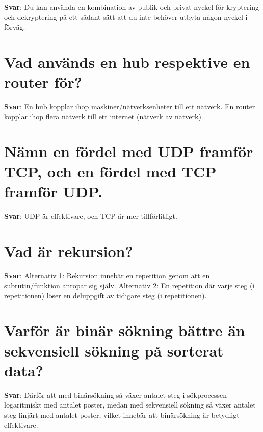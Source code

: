 \documentclass[a4paper,11pt,oneside]{book}
\begin{document}
\begin{sloppypar}
\label{q:170:sa:sv:True}

\textbf{Svar}: Du kan anv\"anda en kombination av publik och privat nyckel f\"or kryptering och dekryptering p\r{a} ett s\r{a}dant s\"att att du inte beh\"over utbyta n\r{a}gon nyckel i f\"orv\"ag.



\section{Vad anv\"ands en hub respektive en router f\"or?}

\label{q:171:sa:sv:True}

\textbf{Svar}: En hub kopplar ihop maskiner/n\"atverksenheter till ett n\"atverk. En router kopplar ihop flera n\"atverk till ett internet (n\"atverk av n\"atverk).



\section{N\"amn en f\"ordel med UDP framf\"or TCP, och en f\"ordel med TCP framf\"or UDP.}

\label{q:172:sa:sv:True}

\textbf{Svar}: UDP \"ar effektivare, och TCP \"ar mer tillf\"orlitligt.



\section{Vad \"ar rekursion?}

\label{q:173:sa:sv:True}

\textbf{Svar}: Alternativ 1: Rekursion inneb\"ar en repetition genom att en subrutin/funktion anropar sig sj\"alv. Alternativ 2: En repetition d\"ar varje steg (i repetitionen) l\"oser en deluppgift av tidigare steg (i repetitionen).



\section{Varf\"or \"ar bin\"ar s\"okning b\"attre \"an sekvensiell s\"okning p\r{a} sorterat data?}

\label{q:174:sa:sv:True}

\textbf{Svar}: D\"arf\"or att med bin\"ars\"okning s\r{a} v\"axer antalet steg i s\"okprocessen logaritmiskt med antalet poster, medan med sekvensiell s\"okning s\r{a} v\"axer antalet steg linj\"art med antalet poster, vilket inneb\"ar att bin\"ars\"okning \"ar betydligt effektivare.




\end{sloppypar}
\end{document}
